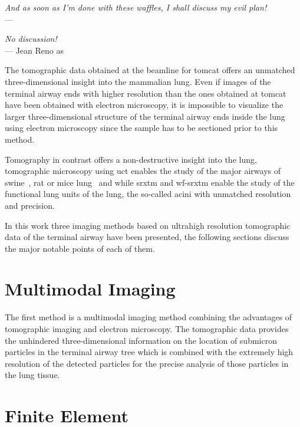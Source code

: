 \acresetall
{}\label{ch:discussion}
\begin{flushright}{\slshape And as soon as I'm done with these waffles, I shall discuss my evil  plan!} \\ \medskip
    ---  \citep{Zim}
\end{flushright}
\begin{flushright}{\slshape No discussion!} \\ \medskip
    --- Jean Reno as \citep{Leon}
\end{flushright}
\vspace{52mm}
The tomographic data obtained at the beamline for \ac{tomcat} offers an unmatched three-dimensional insight into the mammalian lung. Even if images of the terminal airway ends with higher resolution than the ones obtained at \ac{tomcat} have been obtained with electron microscopy, it is impossible to visualize the larger three-dimensional structure of the terminal airway ends inside the lung using electron microscopy since the sample has to be sectioned prior to this method.

Tomography in contrast offers a non-destructive insight into the lung, tomographic microscopy using \ac{uct} enables the study of the major airways of swine~\cite{Litzlbauer2006}, rat  or mice lung~\cite{Langheinrich2004} and while \ac{srxtm} and \ac{wf-srxtm} enable the study of the functional lung units of the lung, the so-called acini with unmatched resolution and precision.

In this work three imaging methods based on ultrahigh resolution tomographic data of the terminal airway have been presented, the following sections discuss the major notable points of each of them.

\section{Multimodal Imaging}
The first method is a multimodal imaging method combining the advantages of tomographic imaging and electron microscopy. The tomographic data provides the unhindered three-dimensional information on the location of submicron particles in the terminal airway tree which is combined with the extremely high resolution of the detected particles for the precise analysis of those particles in the lung tissue.

\section{Finite Element}

